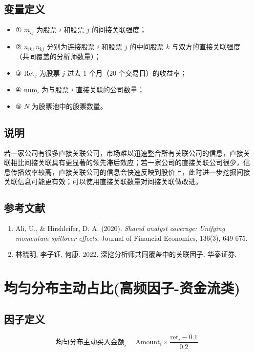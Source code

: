 \documentclass{article}
\begin{document}
\subsection{变量定义}
\begin{itemize}
    \item ① \( m_{ij} \) 为股票 \( i \) 和股票 \( j \) 的间接关联强度；
    \item ② \( n_{ik}, n_{kj} \) 分别为连接股票 \( i \) 和股票 \( j \) 的中间股票 \( k \) 与双方的直接关联强度（共同覆盖的分析师数量）；
    \item ③ \( \mathrm{Ret}_j \) 为股票 \( j \) 过去 1 个月（20 个交易日）的收益率；
    \item ④ \( \mathrm{num}_i \) 为与股票 \( i \) 直接关联的公司数量；
    \item ⑤ \( N \) 为股票池中的股票数量。
\end{itemize}

\subsection{说明}
若一家公司有很多直接关联公司，市场难以迅速整合所有关联公司的信息，直接关联相比间接关联具有更显著的领先滞后效应；若一家公司的直接关联公司很少，信息传播效率较高，直接关联公司的信息会快速反映到股价上，此时进一步挖掘间接关联信息可能更有效；可以使用直接关联数量对间接关联做改进。

\subsection{参考文献}
\begin{enumerate}
    \item Ali, U., \& Hirshleifer, D. A. (2020). \textit{Shared analyst coverage: Unifying momentum spillover effects}. Journal of Financial Economics, 136(3), 649-675.
    \item 林晓明, 李子钰, 何康. 2022. 深挖分析师共同覆盖中的关联因子. 华泰证券.
\end{enumerate}

\section{均匀分布主动占比(高频因子-资金流类)}

\subsection{因子定义}

\begin{equation}
    \text{均匀分布主动买入金额}_i = \mathrm{Amount}_i \times \frac{\mathrm{ret}_i - 0.1}{0.2}
\end{equation}
\end{document}
